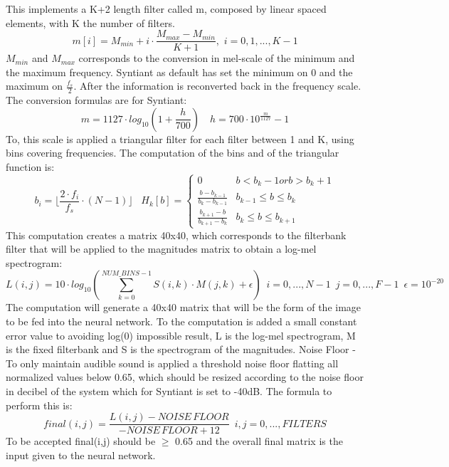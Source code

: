 This implements a K+2 length filter called m, composed by linear spaced elements, with K the number of filters.
\begin{equation}
    m[i]=M_{min}+i\cdot\frac{M_{max}-M_{min}}{K+1},\,\,i=0,1,...,K-1
\end{equation}
$M_{min}$ and $M_{max}$ corresponds to the conversion in mel-scale of the minimum and the maximum frequency. Syntiant as default has set the minimum on 0 and the maximum on $\frac{f_s}{2}$. After the information is reconverted back in the frequency scale. The conversion formulas are for Syntiant:
\begin{equation}
    m=1127\cdot log_{10}(1+\frac{h}{700})\,\,\,\,\,\,h=700\cdot 10^{\frac{m}{1127}}-1
\end{equation}
To, this scale is applied a triangular filter for each filter between 1 and K, using bins covering frequencies. The computation of the bins and of the triangular function is:
\begin{equation}
    b_i=\lfloor \frac{2\cdot f_i}{f_s}\cdot(N-1)\rfloor\,\,\,\,\,H_k[b]=
    \begin{cases}
        0 & b<b_k-1 or b>b_k+1\\
        \frac{b-b_{k-1}}{b_k-b_{k-1}} & b_{k-1}\leq b \leq b_k\\
        \frac{b_{k+1}-b}{b_{k+1}-b_k} & b_k \leq b \leq b_{k+1}
    \end{cases}
\end{equation}
This computation creates a matrix 40x40, which corresponds to the filterbank filter that will be applied to the magnitudes matrix to obtain a log-mel spectrogram:
\begin{equation}
    L(i,j)=10\cdot log_{10}(\sum_{k=0}^{NUM\_BINS-1}S(i,k)\cdot M(j,k)+\epsilon)\,\,\,i=0,...,N-1\,\,\,j=0,...,F-1\,\,\,\epsilon=10^{-20}
\end{equation}
The computation will generate a 40x40 matrix that will be the form of the image to be fed into the neural network. To the computation is added a small constant error value to avoiding log(0) impossible result, L is the log-mel spectrogram, M is the fixed filterbank and S is the spectrogram of the magnitudes. Noise Floor - To only maintain audible sound is applied a threshold noise floor flatting all normalized values below 0.65, which should be resized according to the noise floor in decibel of the system which for Syntiant is set to -40dB. The formula to perform this is:
\begin{equation}
    final(i,j)=\frac{L(i,j)-NOISE\,FLOOR}{-NOISE\,FLOOR+12}\,\,\,i,j=0,...,FILTERS
\end{equation}
To be accepted final(i,j) should be $\geq$ 0.65 and the overall final matrix is the input given to the neural network.
